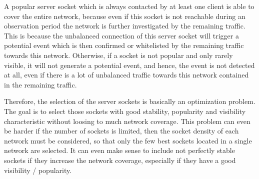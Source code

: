 A popular server socket which is always contacted by at least one client is able 
to cover the entire network, because even if this socket is not reachable during 
an observation period the network is further investigated by the remaining 
traffic. This is because the unbalanced connection of this server socket will 
trigger a potential event which is then confirmed or whitelisted by the 
remaining traffic towards this network. Otherwise, if a socket is not popular 
and only rarely visible, it will not generate a potential event, and hence, the 
event is not detected at all, even if there is a lot of unbalanced traffic 
towards this network contained in the remaining traffic. 

Therefore, the selection of the server sockets is basically an optimization 
problem. The goal is to select those sockets with good stability, popularity and 
visibility characteristic without loosing to much network coverage. This problem 
can even be harder if the number of sockets is limited, then the socket density 
of each network must be considered, so that only the few best sockets located in 
a single network are selected. It can even make sense to include not perfectly 
stable sockets if they increase the network coverage, especially if they have a 
good visibility / popularity.

